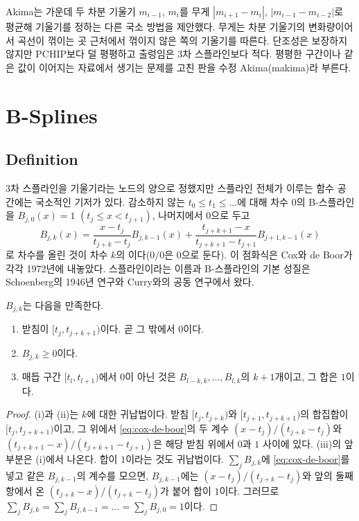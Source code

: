 Akima는 가운데 두 차분 기울기 $m_{i-1}$, $m_i$를 무게 $|m_{i+1}-m_i|$, $|m_{i-1}-m_{i-2}|$로 평균해 기울기를 정하는 다른 국소 방법을 제안했다\cite{akima1970}. 무게는 차분 기울기의 변화량이어서 곡선이 꺾이는 곳 근처에서 꺾이지 않은 쪽의 기울기를 따른다. 단조성은 보장하지 않지만 PCHIP보다 덜 평평하고 출렁임은 3차 스플라인보다 적다. 평평한 구간이나 같은 값이 이어지는 자료에서 생기는 문제를 고친 판을 수정 Akima(makima)라 부른다.

\section{B-Splines}
\label{sec:bspline}

\subsection{Definition}

3차 스플라인을 기울기라는 노드의 양으로 정했지만 스플라인 전체가 이루는 함수 공간에는 국소적인 기저가 있다. 감소하지 않는  $t_0\le t_1\le\dots$에 대해 차수 $0$의 B-스플라인을 $B_{j,0}(x)=1$ $(t_j\le x<t_{j+1})$, 나머지에서 $0$으로 두고
\begin{equation}
\label{eq:cox-de-boor}
B_{j,k}(x)=\frac{x-t_j}{t_{j+k}-t_j}B_{j,k-1}(x)+\frac{t_{j+k+1}-x}{t_{j+k+1}-t_{j+1}}B_{j+1,k-1}(x)
\end{equation}
로 차수를 올린 것이 차수 $k$의 이다($0/0$은 $0$으로 둔다). 이 점화식은 Cox와 de Boor가 각각 1972년에 내놓았다\cite{cox1972,deboor1972}. 스플라인이라는 이름과 B-스플라인의 기본 성질은 Schoenberg의 1946년 연구와 Curry와의 공동 연구에서 왔다\cite{schoenberg1946,curry1966}.

\begin{proposition}
\label{prop:bspline-properties}
$B_{j,k}$는 다음을 만족한다.
\begin{enumerate}
\item 받침이 $[t_j,t_{j+k+1})$이다. 곧 그 밖에서 $0$이다.
\item $B_{j,k}\ge0$이다.
\item 매듭 구간 $[t_l,t_{l+1})$에서 $0$이 아닌 것은 $B_{l-k,k},\dots,B_{l,k}$의 $k+1$개이고, 그 합은 $1$이다.
\end{enumerate}
\end{proposition}

\begin{proof}
(i)과 (ii)는 $k$에 대한 귀납법이다. 받침 $[t_j,t_{j+k})$와 $[t_{j+1},t_{j+k+1})$의 합집합이 $[t_j,t_{j+k+1})$이고, 그 위에서 \eqref{eq:cox-de-boor}의 두 계수 $(x-t_j)/(t_{j+k}-t_j)$와 $(t_{j+k+1}-x)/(t_{j+k+1}-t_{j+1})$은 해당 받침 위에서 $0$과 $1$ 사이에 있다. (iii)의 앞부분은 (i)에서 나온다. 합이 $1$이라는 것도 귀납법이다. $\sum_jB_{j,k}$에 \eqref{eq:cox-de-boor}를 넣고 같은 $B_{j,k-1}$의 계수를 모으면, $B_{j,k-1}$에는 $(x-t_j)/(t_{j+k}-t_j)$와 앞의 둘째 항에서 온 $(t_{j+k}-x)/(t_{j+k}-t_j)$가 붙어 합이 $1$이다. 그러므로 $\sum_jB_{j,k}=\sum_jB_{j,k-1}=\dots=\sum_jB_{j,0}=1$이다.
\end{proof}


